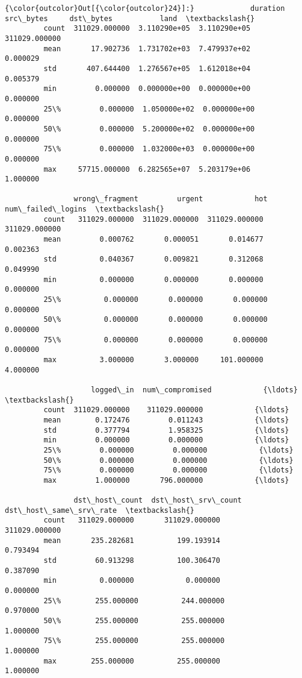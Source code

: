 \documentclass[11pt]{article}
\begin{document}
\begin{Verbatim}[commandchars=\\\{\}]
{\color{outcolor}Out[{\color{outcolor}24}]:}             duration     src\_bytes     dst\_bytes           land  \textbackslash{}
         count  311029.000000  3.110290e+05  3.110290e+05  311029.000000   
         mean       17.902736  1.731702e+03  7.479937e+02       0.000029   
         std       407.644400  1.276567e+05  1.612018e+04       0.005379   
         min         0.000000  0.000000e+00  0.000000e+00       0.000000   
         25\%         0.000000  1.050000e+02  0.000000e+00       0.000000   
         50\%         0.000000  5.200000e+02  0.000000e+00       0.000000   
         75\%         0.000000  1.032000e+03  0.000000e+00       0.000000   
         max     57715.000000  6.282565e+07  5.203179e+06       1.000000   
         
                wrong\_fragment         urgent            hot  num\_failed\_logins  \textbackslash{}
         count   311029.000000  311029.000000  311029.000000      311029.000000   
         mean         0.000762       0.000051       0.014677           0.002363   
         std          0.040367       0.009821       0.312068           0.049990   
         min          0.000000       0.000000       0.000000           0.000000   
         25\%          0.000000       0.000000       0.000000           0.000000   
         50\%          0.000000       0.000000       0.000000           0.000000   
         75\%          0.000000       0.000000       0.000000           0.000000   
         max          3.000000       3.000000     101.000000           4.000000   
         
                    logged\_in  num\_compromised            {\ldots}             \textbackslash{}
         count  311029.000000    311029.000000            {\ldots}              
         mean        0.172476         0.011243            {\ldots}              
         std         0.377794         1.958325            {\ldots}              
         min         0.000000         0.000000            {\ldots}              
         25\%         0.000000         0.000000            {\ldots}              
         50\%         0.000000         0.000000            {\ldots}              
         75\%         0.000000         0.000000            {\ldots}              
         max         1.000000       796.000000            {\ldots}              
         
                dst\_host\_count  dst\_host\_srv\_count  dst\_host\_same\_srv\_rate  \textbackslash{}
         count   311029.000000       311029.000000           311029.000000   
         mean       235.282681          199.193914                0.793494   
         std         60.913298          100.306470                0.387090   
         min          0.000000            0.000000                0.000000   
         25\%        255.000000          244.000000                0.970000   
         50\%        255.000000          255.000000                1.000000   
         75\%        255.000000          255.000000                1.000000   
         max        255.000000          255.000000                1.000000   
         

\end{Verbatim}
\end{document}
